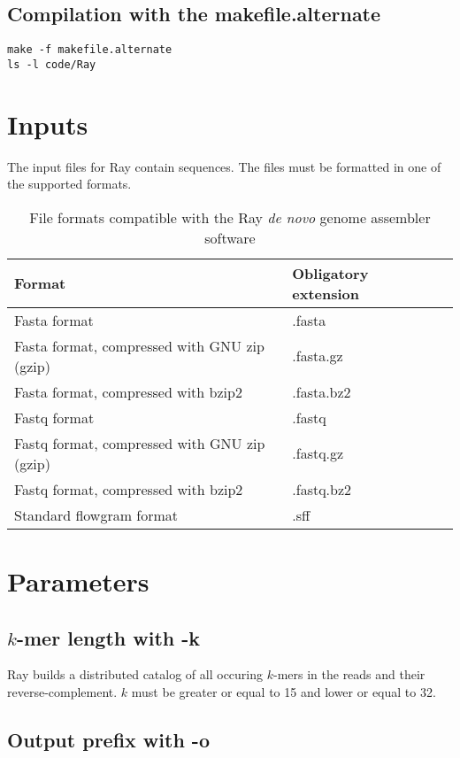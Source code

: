 \documentclass{article}
\begin{document}
\subsection{Compilation with the makefile.alternate}

\begin{verbatim}
make -f makefile.alternate
ls -l code/Ray
\end{verbatim}

\section{Inputs}

The input files for Ray contain sequences. The files must be formatted in one of the supported formats.

\begin{table}[h]
\caption{File formats compatible with the Ray \emph{de novo} genome assembler software}
\begin{tabular}{lll}
\hline
Format & Obligatory extension \\
\hline
Fasta format & .fasta\\
Fasta format, compressed with GNU zip (gzip) & .fasta.gz \\
Fasta format, compressed with bzip2 & .fasta.bz2 \\
Fastq format & .fastq\\
Fastq format, compressed with GNU zip (gzip) & .fastq.gz \\
Fastq format, compressed with bzip2 & .fastq.bz2 \\
Standard flowgram format & .sff \\
\hline
\end{tabular}
\end{table}



\section{Parameters}

\subsection{$k$-mer length with -k}

Ray builds a distributed catalog of all occuring $k$-mers in the reads and their reverse-complement. $k$ must be greater or equal to 15 and lower or equal to 32.

\subsection{Output prefix with -o}
\end{document}
